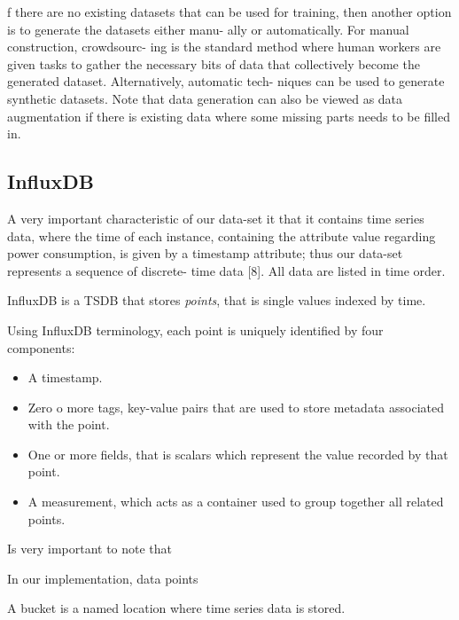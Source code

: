 \documentclass[12pt,a4paper]{report}
\theoremstyle{definition}
\begin{document}
f there are no existing datasets that can be used for training,
then another option is to generate the datasets either manu-
ally or automatically. For manual construction, crowdsourc-
ing is the standard method where human workers are given
tasks to gather the necessary bits of data that collectively
become the generated dataset. Alternatively, automatic tech-
niques can be used to generate synthetic datasets. Note that
data generation can also be viewed as data augmentation if
there is existing data where some missing parts needs to be
filled in.

\subsection{InfluxDB}

A very important characteristic of our data-set it that it contains time series data, where the time of each instance, containing the attribute value regarding power consumption, is given by a timestamp attribute; thus our data-set represents a sequence of discrete-
time data [8]. All data are listed in time order.


InfluxDB is a TSDB that stores \textit{points}, that is single values indexed by time. 

Using InfluxDB terminology, each point is uniquely identified by four components:

\begin{itemize}
	\item A timestamp.
	
	\item Zero o more tags, key-value pairs that are used to store metadata associated with the point. 
	 
	\item One or more fields, that is scalars which represent the value recorded by that point.
	
	\item A measurement, which acts as a container used to group together all related points.
	
\end{itemize}

Is very important to note that  

In our implementation, data points 

A bucket is a named location where time series data is stored.







\end{document}
